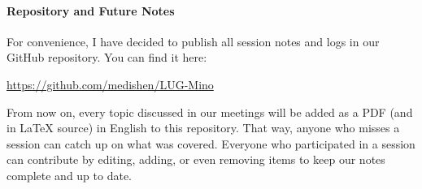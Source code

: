     \paragraph{Repository and Future Notes} For convenience, I have decided to publish all session notes and logs in our GitHub repository. You can find it here:
    
    \begin{center}
        \url{https://github.com/medishen/LUG-Mino}
    \end{center}
    
    From now on, every topic discussed in our meetings will be added as a PDF (and in LaTeX source) in English to this repository. That way, anyone who misses a session can catch up on what was covered. Everyone who participated in a session can contribute by editing, adding, or even removing items to keep our notes complete and up to date.
    
	
